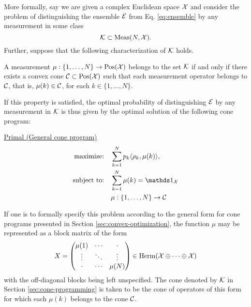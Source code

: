 More formally, say we are given a complex Euclidean space $\mathcal{X}$ and consider the
problem of distinguishing the ensemble $\mathcal{E}$ from  Eq. \eqref{eq:ensemble} by 
any measurement in some class 
\begin{equation}
  \mathcal{K} \subset \mathrm{Meas}(N,\mathcal{X}). 
\end{equation}
Further, suppose that the following characterization of $\mathcal{K}$ holds.
\begin{property}
\label{property:each-measurement-operator}
A measurement $\mu : \{1, \ldots, N\} \rightarrow \mathrm{Pos}(\mathcal{X})$ belongs to the set $\mathcal{K}$ 
if and only if there exists a convex cone $\mathcal{C} \subset \mathrm{Pos}(\mathcal{X})$ such that each 
measurement operator belongs to $\mathcal{C}$, that is, $\mu(k)\in \mathcal{C}$, 
for each $k \in \{1,\ldots, N\}$.
\end{property}

If this property is satisfied, the optimal probability of distinguishing $\mathcal{E}$ 
by any measurement in $\mathcal{K}$ is thus given by the optimal solution of the 
following cone program:
\begin{center}
\underline{Primal (General cone program)}
\begin{equation}
  \label{eq:cone-primal-problem}
  \begin{split}
    \text{maximize:} \quad & 
      \sum_{k=1}^{N} p_{k}\ip{\rho_{k}}{\mu(k)},\\
    \text{subject to:} \quad & \sum_{k=1}^{N} \mu(k) = \I_{\X}\\
    & \mu : \{1,\ldots, N\}\rightarrow \C
  \end{split}
\end{equation}
\end{center}

If one is to formally specify this problem according to the general form for
cone programs presented in Section \ref{sec:convex-optimization}, the function 
$\mu$ may be represented as a block matrix of the form
\begin{equation}
  X = \begin{pmatrix}
    \mu(1) & \cdots & \cdot \\
    \vdots & \ddots & \vdots\\
    \cdot & \cdots & \mu(N)
  \end{pmatrix} \in \mathrm{Herm}(\mathcal{X} \oplus \cdots \oplus \mathcal{X})
\end{equation}
with the off-diagonal blocks being left unspecified.
The cone denoted by $\mathcal{K}$ in Section \ref{sec:cone-programming} is taken to be 
the cone of operators of this form for which each $\mu(k)$ belongs to the cone 
$\mathcal{C}$.

